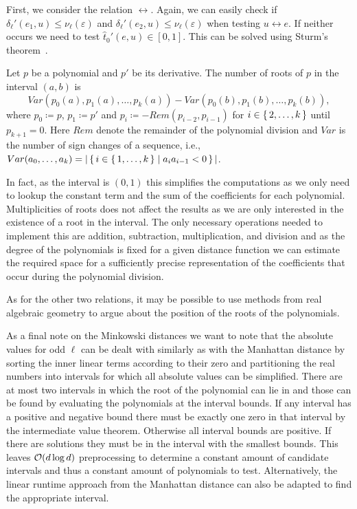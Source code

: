 First, we consider the relation \(\leftrightarrow\). Again, we can easily check if \(\delta_\ell'(e_1, u) \leq \nu_\ell(\varepsilon)\) and \(\delta_\ell'(e_2, u) \leq \nu_\ell(\varepsilon)\) when testing \(u \leftrightarrow e\). If neither occurs we need to test \(\hat t_0'(e, u) \in [0,1]\). This can be solved using Sturm's theorem~\cite{algorithms_in_real_algebraic_geometry}. 
\begin{theorem}
  Let \(p\) be a polynomial and \(p'\) be its derivative. The number of roots of \(p\) in the interval \((a,b)\) is 
  \[Var(p_0(a), p_1(a), \dots, p_k(a)) - Var(p_0(b), p_1(b), \dots, p_k(b)),\]
  where \(p_0 \coloneq p\), \(p_1 \coloneq p'\) and \(p_i \coloneq -Rem(p_{i-2}, p_{i-1})\) for \(i \in \set{2, \dots, k}\) until \(p_{k+1} = 0\). 
  Here \(Rem\) denote the remainder of the polynomial division and \(Var\) is the number of sign changes of a sequence, i.e., \(Var(a_0,\dots, a_k) = |\set{i \in \set{1, \dots, k} \mid a_ia_{i-1} < 0}|\).
\end{theorem}

In fact, as the interval is \((0, 1)\) this simplifies the computations as we only need to lookup the constant term and the sum of the coefficients for each polynomial. 
Multiplicities of roots does not affect the results as we are only interested in the existence of a root in the interval. 
The only necessary operations needed to implement this are addition, subtraction, multiplication, and division and as the degree of the polynomials is fixed for a given distance function we can estimate the required space for a sufficiently precise representation of the coefficients that occur during the polynomial division. 

As for the other two relations, it may be possible to use methods from real algebraic geometry to argue about the position of the roots of the polynomials. 

As a final note on the Minkowski distances we want to note that the absolute values for odd \(\ell\) can be dealt with similarly as with the Manhattan distance by sorting the inner linear terms according to their zero and partitioning the real numbers into intervals for which all absolute values can be simplified. There are at most two intervals in which the root of the polynomial can lie in and those can be found by evaluating the polynomials at the interval bounds. If any interval has a positive and negative bound there must be exactly one zero in that interval by the intermediate value theorem. Otherwise all interval bounds are positive. If there are solutions they must be in the interval with the smallest bounds. This leaves \(\mathcal{O}(d\log d)\) preprocessing to determine a constant amount of candidate intervals and thus a constant amount of polynomials to test. Alternatively, the linear runtime approach from the Manhattan distance can also be adapted to find the appropriate interval. 

